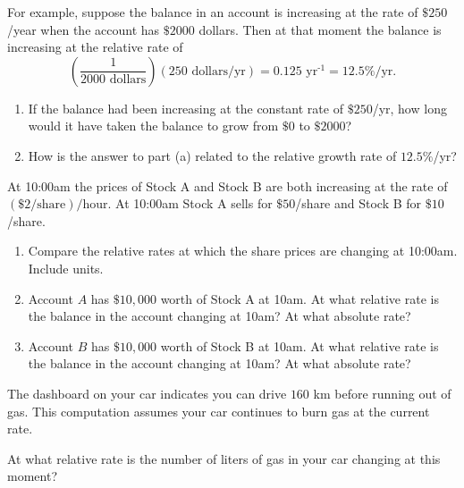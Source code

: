 \documentclass{ximera}
\begin{document}
\begin{question}  \label{QPff32}
For example, suppose the balance in an account is increasing at the rate of $\$250$/year when the account has $\$2000$ dollars. Then at that moment the balance is increasing at the relative rate of
\[
  \left( \frac{1}{2000\text{ dollars}} \right) \left( 250 \text{ dollars/yr} \right) = 0.125 \text{ yr}^\text{-1} = 12.5\% /\text{yr}.
\]

\begin{enumerate}
\item If the balance had been increasing at the constant rate of $\$250$/yr, how long would it have taken the balance to grow from $\$0$ to $\$2000$?

\item How is the answer to part (a) related to the relative growth rate of $12.5\%$/yr? 
\end{enumerate}

\end{question}


\begin{question} \label{Q9f03r3r}
At 10:00am the prices of Stock A and Stock B are both increasing at the rate of $(\$2/\text{share})/\text{hour}$. At 10:00am Stock A sells for $\$50$/share and Stock B for $\$10$/share. 
\begin{enumerate}
\item Compare the relative rates at which the share prices are changing at 10:00am. Include units.

\item Account $A$ has $\$10,000$ worth of Stock A at 10am. At what relative rate is the balance in the account changing at 10am? At what absolute rate?

\item  Account $B$ has $\$10,000$ worth of Stock B at 10am. At what relative rate is the balance in the account changing at 10am? At what absolute rate?

\end{enumerate}
\end{question}

\begin{question} \label{Q8f8vr3r3}
The dashboard on your car indicates you can drive $160$ km before running out of gas. This computation assumes your car continues to burn gas at the current rate. 

At what relative rate is the number of liters of gas in your car changing at this moment?

\end{question}
\end{document}
